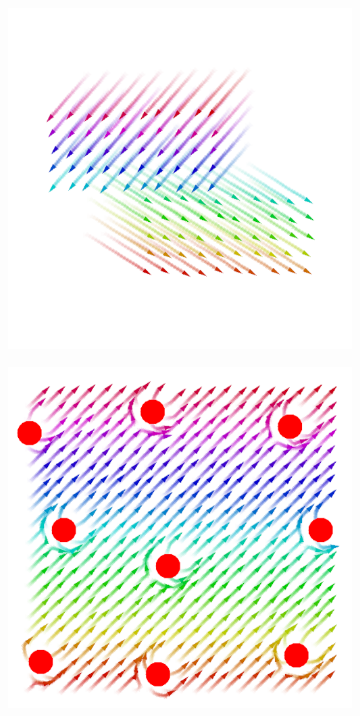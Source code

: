 \begin{figure}[t]
\begin{subfigure}{0.32\textwidth}
  \caption{}
  \label{coordination2023-macro:fig:towards-leader}
\end{subfigure}
\hfill
\begin{subfigure}{0.32\textwidth}
  \centering
  {\includegraphics[width=\textwidth]{papers/coordination2023-macro/images/branching.png}}
  \caption{}
  \label{coordination2023-macro:fig:team}
\end{subfigure}
\hfill
\begin{subfigure}{0.32\textwidth}
  \centering
  {\includegraphics[width=\textwidth]{papers/coordination2023-macro/images/obstacle-avoidance.png}}

\end{subfigure}
\end{figure}
